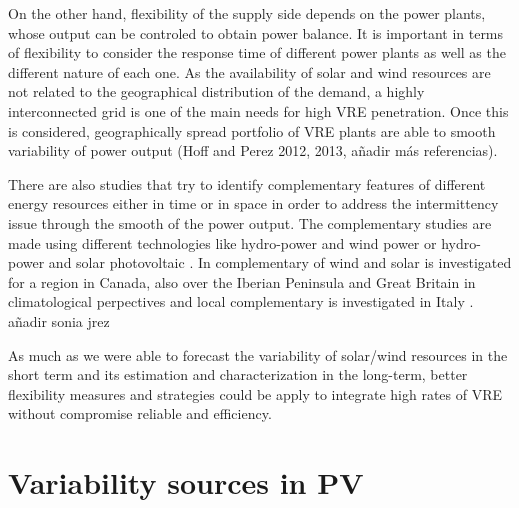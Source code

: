 On the other hand, flexibility of the supply side depends on the power plants, whose output can be controled to obtain power balance. It is important in terms of flexibility to consider the response time of different power plants as well as the different nature of each one. As the availability of solar and wind resources are not related to the geographical distribution of the demand, a highly interconnected grid is one of the main needs for high VRE penetration. Once this is considered, geographically spread portfolio of VRE plants are able to smooth variability of power output \cite*{KROPOSKI2017, Marcos2012}(Hoff and Perez 2012, 2013, añadir más referencias).


There are also studies that try to identify complementary features of different energy resources either in time or in space in order to address the intermittency issue through the smooth of the power output. The complementary studies are made using different technologies like hydro-power and wind power \cite*{Denault2009, Silva2016} or hydro-power and solar photovoltaic \cite*{Francois2016, Beluco2012, Kougias2016}. In \cite*{Hoicka2011} complementary of wind and solar is investigated for a region in Canada, also over the Iberian Peninsula \cite*{Santos-Alamillos2012} and Great Britain \cite*{Bett2016} in climatological perpectives and local complementary is investigated in Italy \cite*{Monforti2014}. {\color{blue}añadir sonia jrez}  


{\color{red}As much as we were able to forecast the variability of solar/wind resources in the short term and its estimation and characterization in the long-term, better flexibility measures and strategies could be apply to integrate high rates of VRE without compromise reliable and efficiency.}

\section{Variability sources in PV}

